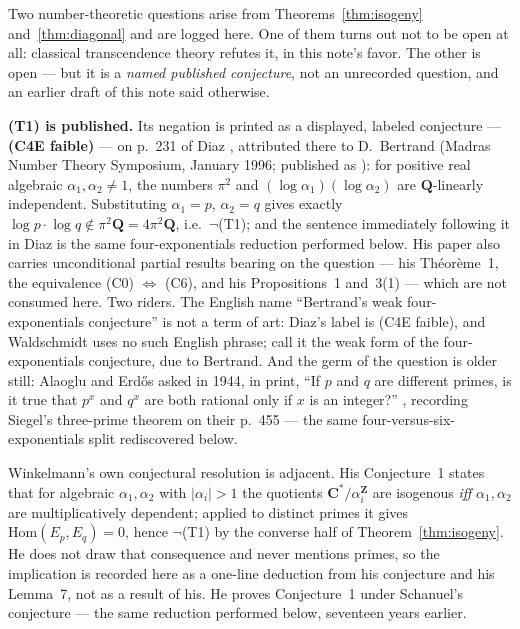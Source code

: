\documentclass[11pt]{article}
\theoremstyle{definition}
\theoremstyle{remark}
\newcommand{\Z}{\mathbf{Z}}
\newcommand{\Q}{\mathbf{Q}}
\newcommand{\C}{\mathbf{C}}
\newcommand{\Hom}{\mathrm{Hom}}
\begin{document}
Two number-theoretic questions arise from Theorems~\ref{thm:isogeny}
and~\ref{thm:diagonal} and are logged here. One of them turns out not to be
open at all: classical transcendence theory refutes it, in this note's
favor. The other is open --- but it is a \emph{named published conjecture},
not an unrecorded question, and an earlier draft of this note said otherwise.

\medskip

\noindent\textbf{(T1) is published.} Its negation is printed as a displayed,
labeled conjecture --- \textbf{(C4E faible)} --- on p.~231 of Diaz
\cite{Dia97}, attributed there to D.~Bertrand (Madras Number Theory Symposium,
January 1996; published as \cite[\S5]{Ber97}): for positive real algebraic
$\alpha_1, \alpha_2 \neq 1$, the numbers $\pi^2$ and
$(\log\alpha_1)(\log\alpha_2)$ are $\Q$-linearly independent. Substituting
$\alpha_1 = p$, $\alpha_2 = q$ gives exactly
$\log p \cdot \log q \notin \pi^2\Q = 4\pi^2\Q$, i.e.\ $\neg$(T1); and the
sentence immediately following it in Diaz is the same four-exponentials
reduction performed below. His paper also carries unconditional partial results
bearing on the question --- his Th\'eor\`eme~1, the equivalence (C0)
$\Leftrightarrow$ (C6), and his Propositions~1 and~3(1) --- which are not
consumed here. Two riders. The English name ``Bertrand's weak four-exponentials
conjecture'' is not a term of art: Diaz's label is (C4E faible), and Waldschmidt
uses no such English phrase; call it the weak form of the four-exponentials
conjecture, due to Bertrand. And the germ of the question is older still: Alaoglu
and Erd\H{o}s asked in 1944, in print, ``If $p$ and $q$ are different primes, is
it true that $p^x$ and $q^x$ are both rational only if $x$ is an integer?''
\cite[p.~449]{AE44}, recording Siegel's three-prime theorem on their p.~455 ---
the same four-versus-six-exponentials split rediscovered below.

Winkelmann's own conjectural resolution is adjacent. His Conjecture~1
\cite[\S3.2, p.~13]{Wi04} states that for algebraic $\alpha_1, \alpha_2$ with
$|\alpha_i| > 1$ the quotients $\C^*/\alpha_i^{\Z}$ are isogenous \emph{iff}
$\alpha_1, \alpha_2$ are multiplicatively dependent; applied to distinct primes
it gives $\Hom(E_p, E_q) = 0$, hence $\neg$(T1) by the converse half of
Theorem~\ref{thm:isogeny}. He does not draw that consequence and never mentions
primes, so the implication is recorded here as a one-line deduction from his
conjecture and his Lemma~7, not as a result of his. He proves Conjecture~1 under
Schanuel's conjecture \cite[\S3.2, Prop.~3, p.~14]{Wi04} --- the same reduction
performed below, seventeen years earlier.
\end{document}
